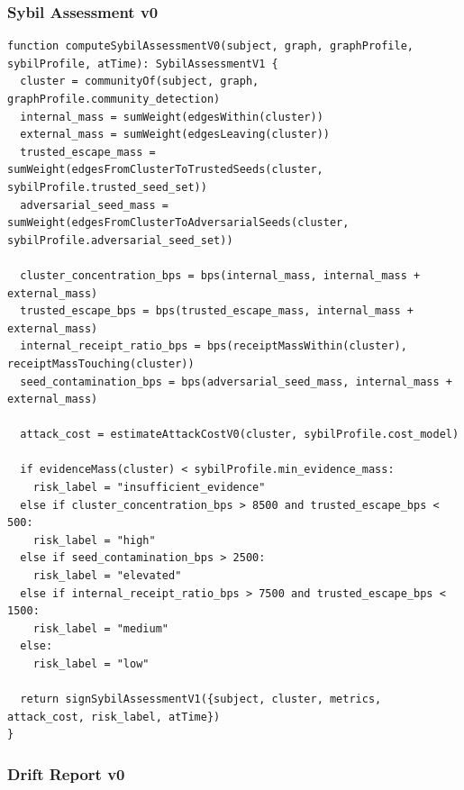 \documentclass[11pt]{article}
\begin{document}
\subsubsection{Sybil Assessment v0}

\begin{lstlisting}[style=tslcode]
function computeSybilAssessmentV0(subject, graph, graphProfile, sybilProfile, atTime): SybilAssessmentV1 {
  cluster = communityOf(subject, graph, graphProfile.community_detection)
  internal_mass = sumWeight(edgesWithin(cluster))
  external_mass = sumWeight(edgesLeaving(cluster))
  trusted_escape_mass = sumWeight(edgesFromClusterToTrustedSeeds(cluster, sybilProfile.trusted_seed_set))
  adversarial_seed_mass = sumWeight(edgesFromClusterToAdversarialSeeds(cluster, sybilProfile.adversarial_seed_set))

  cluster_concentration_bps = bps(internal_mass, internal_mass + external_mass)
  trusted_escape_bps = bps(trusted_escape_mass, internal_mass + external_mass)
  internal_receipt_ratio_bps = bps(receiptMassWithin(cluster), receiptMassTouching(cluster))
  seed_contamination_bps = bps(adversarial_seed_mass, internal_mass + external_mass)

  attack_cost = estimateAttackCostV0(cluster, sybilProfile.cost_model)

  if evidenceMass(cluster) < sybilProfile.min_evidence_mass:
    risk_label = "insufficient_evidence"
  else if cluster_concentration_bps > 8500 and trusted_escape_bps < 500:
    risk_label = "high"
  else if seed_contamination_bps > 2500:
    risk_label = "elevated"
  else if internal_receipt_ratio_bps > 7500 and trusted_escape_bps < 1500:
    risk_label = "medium"
  else:
    risk_label = "low"

  return signSybilAssessmentV1({subject, cluster, metrics, attack_cost, risk_label, atTime})
}
\end{lstlisting}

\subsubsection{Drift Report v0}
\end{document}
